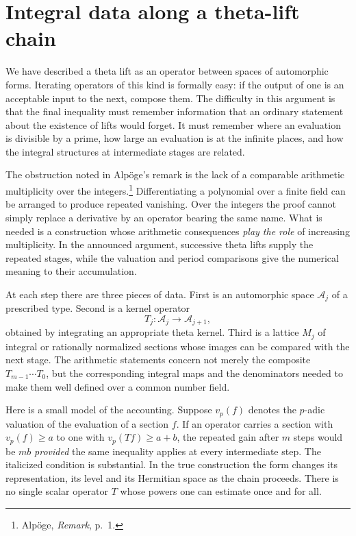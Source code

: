 \documentclass[11pt,openany,oneside]{scrbook}
\theoremstyle{definition}
\theoremstyle{remark}
\begin{document}
\section{Integral data along a theta-lift chain}\label{sec:theta-chain}

We have described a theta lift as an operator between spaces of automorphic forms.  Iterating operators of this kind is formally easy: if the output of one is an acceptable input to the next, compose them.  The difficulty in this argument is that the final inequality must remember information that an ordinary statement about the existence of lifts would forget.  It must remember where an evaluation is divisible by a prime, how large an evaluation is at the infinite places, and how the integral structures at intermediate stages are related.

The obstruction noted in Alp\"oge's remark is the lack of a comparable arithmetic multiplicity over the integers.\footnote{Alp\"oge, \emph{Remark}, p.~1.}  Differentiating a polynomial over a finite field can be arranged to produce repeated vanishing.  Over the integers the proof cannot simply replace a derivative by an operator bearing the same name.  What is needed is a construction whose arithmetic consequences \emph{play the role} of increasing multiplicity.  In the announced argument, successive theta lifts supply the repeated stages, while the valuation and period comparisons give the numerical meaning to their accumulation.

At each step there are three pieces of data.  First is an automorphic space $\mathcal A_j$ of a prescribed type.  Second is a kernel operator
\[
T_j:\mathcal A_j\longrightarrow\mathcal A_{j+1},
\]
obtained by integrating an appropriate theta kernel.  Third is a lattice $M_j$ of integral or rationally normalized sections whose images can be compared with the next stage.  The arithmetic statements concern not merely the composite $T_{m-1}\cdots T_0$, but the corresponding integral maps and the denominators needed to make them well defined over a common number field.

Here is a small model of the accounting.  Suppose $v_p(f)$ denotes the $p$-adic valuation of the evaluation of a section $f$.  If an operator carries a section with $v_p(f)\ge a$ to one with $v_p(Tf)\ge a+b$, the repeated gain after $m$ steps would be $mb$ \emph{provided} the same inequality applies at every intermediate step.  The italicized condition is substantial.  In the true construction the form changes its representation, its level and its Hermitian space as the chain proceeds.  There is no single scalar operator $T$ whose powers one can estimate once and for all.
\end{document}
